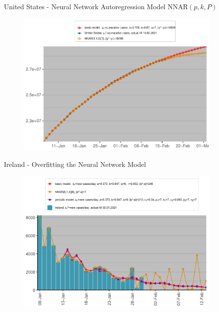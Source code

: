 \documentclass{beamer}
\begin{document}
\begin{frame}{United States - Neural Network Autoregression Model NNAR$(p,k,P)$}
\begin{figure}
\includegraphics[width=0.9\textwidth]{Plots/United States-nny.pdf}
\end{figure}
\end{frame}

\begin{frame}{Ireland - Overfitting the Neural Network Model}
\begin{figure}
\includegraphics[width=0.9\textwidth]{Plots/Ireland-overfit.png}
\end{figure}
\end{frame}
\end{document}
